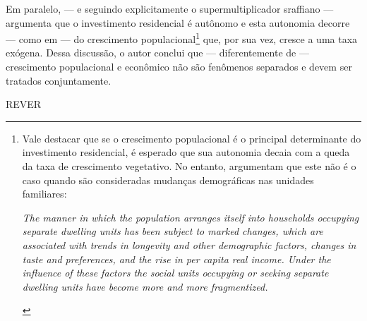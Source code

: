 Em paralelo, --- e seguindo explicitamente o supermultiplicador sraffiano --- \textcite{gowans_introducing_2014} argumenta que o investimento residencial é autônomo e esta autonomia decorre --- como em \textcite{hansen_economic_1939} --- do crescimento populacional\footnote{
	Vale destacar que se o crescimento populacional é o principal determinante do investimento residencial, é esperado que sua autonomia decaia com a queda da taxa de crescimento vegetativo.
	No entanto,  \textcite[p.~11]{grebler_capital_1956} argumentam que este não é o caso quando são consideradas mudanças demográficas nas unidades familiares:
	
	\begin{citacao}
		\textit{The manner in which the population arranges itself into households
			occupying separate dwelling units has been subject to marked changes,
			which are associated with trends in longevity and other demographic
			factors, changes in taste and preferences, and the rise in per capita real
			income. Under the influence of these factors the social units occupying
			or seeking separate dwelling units have become more and more fragmentized.}
	\end{citacao}
} que, por sua vez, cresce a uma taxa exógena.
Dessa discussão, o autor conclui que --- diferentemente de \textcite{robinson_model_1962} --- crescimento populacional e econômico não são fenômenos separados e devem ser tratados conjuntamente.

REVER

